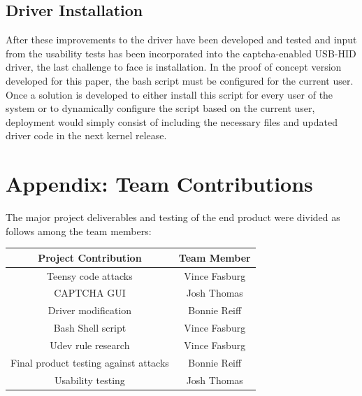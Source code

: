\documentclass[pagenumbers]{ieee}
\begin{document}
\subsection{Driver Installation}
\label{section:installation}

After these improvements to the driver have been developed and tested and input from the usability tests has been incorporated into the captcha-enabled USB-HID driver, the last challenge to face is installation. In the proof of concept version developed for this paper, the bash script must be configured for the current user. Once a solution is developed to either install this script for every user of the system or to dynamically configure the script based on the current user, deployment would simply consist of including the necessary files and updated driver code in the next kernel release.



\appendix 

\newpage%

\section{Appendix: Team Contributions}

The major project deliverables and testing of the end product were divided as follows among the team members:

\begin{center}
	\begin{tabular}{ | c | c | }
		\hline \textbf{Project Contribution} & \textbf{Team Member} \\ \hline
		Teensy code attacks & Vince Fasburg \\ \hline
		CAPTCHA GUI & Josh Thomas \\ \hline
		Driver modification & Bonnie Reiff \\ \hline
		Bash Shell script & Vince Fasburg \\ \hline
		Udev rule research & Vince Fasburg \\ \hline
		Final product testing against attacks & Bonnie Reiff \\ \hline
		Usability testing & Josh Thomas \\ \hline
	\end{tabular}
\end{center}
\end{document}
